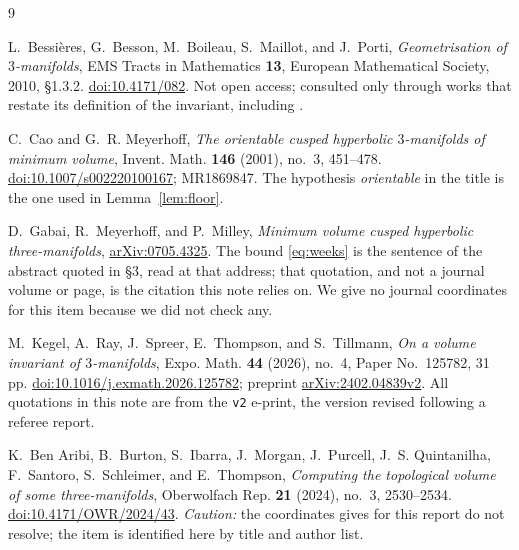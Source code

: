 \documentclass[11pt]{amsart}
\theoremstyle{definition}
\theoremstyle{remark}
\begin{document}
\begin{thebibliography}{9}

L.~Bessi\`eres, G.~Besson, M.~Boileau, S.~Maillot, and J.~Porti,
\emph{Geometrisation of $3$-manifolds},
EMS Tracts in Mathematics \textbf{13}, European Mathematical Society, 2010,
\S1.3.2. \href{https://doi.org/10.4171/082}{doi:10.4171/082}.
Not open access; consulted only through works that restate its definition of the invariant,
including \cite{KRSTT}.

C.~Cao and G.~R. Meyerhoff,
\emph{The orientable cusped hyperbolic $3$-manifolds of minimum volume},
Invent. Math. \textbf{146} (2001), no.~3, 451--478.
\href{https://doi.org/10.1007/s002220100167}{doi:10.1007/s002220100167}; MR1869847.
The hypothesis \emph{orientable} in the title is the one used in Lemma~\ref{lem:floor}.

D.~Gabai, R.~Meyerhoff, and P.~Milley,
\emph{Minimum volume cusped hyperbolic three-manifolds},
\href{https://arxiv.org/abs/0705.4325}{arXiv:0705.4325}.
The bound \eqref{eq:weeks} is the sentence of the abstract quoted in \S3, read at that
address; that quotation, and not a journal volume or page, is the citation this note relies
on. We give no journal coordinates for this item because we did not check any.

M.~Kegel, A.~Ray, J.~Spreer, E.~Thompson, and S.~Tillmann,
\emph{On a volume invariant of $3$-manifolds},
Expo. Math. \textbf{44} (2026), no.~4, Paper No.~125782, 31 pp.
\href{https://doi.org/10.1016/j.exmath.2026.125782}{doi:10.1016/j.exmath.2026.125782};
preprint \href{https://arxiv.org/abs/2402.04839v2}{arXiv:2402.04839v2}.
All quotations in this note are from the \texttt{v2} e-print, the version revised following
a referee report.

K.~Ben Aribi, B.~Burton, S.~Ibarra, J.~Morgan, J.~Purcell, J.~S. Quintanilha, F.~Santoro,
S.~Schleimer, and E.~Thompson,
\emph{Computing the topological volume of some three-manifolds},
Oberwolfach Rep. \textbf{21} (2024), no.~3, 2530--2534.
\href{https://doi.org/10.4171/OWR/2024/43}{doi:10.4171/OWR/2024/43}.
\emph{Caution:} the coordinates \cite{KRSTT} gives for this report do not
resolve; the item is identified here by title and author list.

\end{thebibliography}
\end{document}
